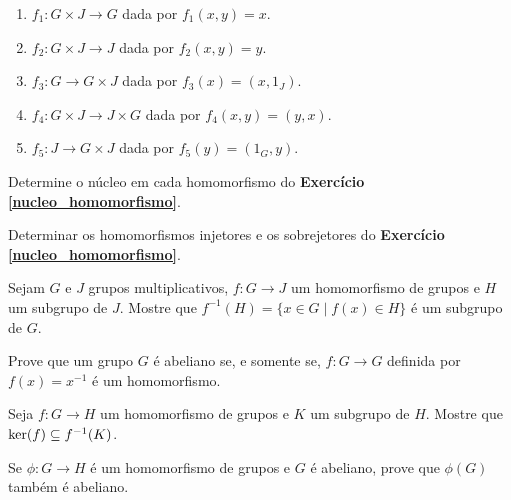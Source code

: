 \documentclass[12pt]{exam}
\begin{document}
    \begin{enumerate}[label=({\alph*})]
      \item $f_1 : G \times J \to G$ dada por $f_1(x,y) = x$.

      \item $f_2 : G \times J \to J$ dada por $f_2(x,y) = y$.

      \item $f_3 : G  \to G \times J$ dada por $f_3(x) = (x, 1_J)$.

      \item $f_4 : G \times J \to J \times G$ dada por $f_4(x,y) = (y, x)$.

      \item $f_5 : J \to G \times J$ dada por $f_5(y) = (1_G, y)$.
    \end{enumerate}

    \vspace{.3cm}

    \questao{} Determine o núcleo em cada homomorfismo do \textbf{Exercício \ref{nucleo_homomorfismo}}.

    \vspace{.3cm}

    \questao{} Determinar os homomorfismos injetores e os sobrejetores do \textbf{Exercício \ref{nucleo_homomorfismo}}.

    \vspace{.3cm}

    \questao{} Sejam $G$ e $J$ grupos multiplicativos, $f : G \to J$ um homomorfismo de grupos e $H$ um subgrupo de $J$. Mostre que $f^{-1}(H) = \{ x \in G \mid f(x) \in H\}$ é um subgrupo de $G$.

    \vspace{.3cm}

    \questao{} Prove que um grupo $G$ é abeliano se, e somente se, $f : G \to G$ definida por $f(x) = x^{-1}$ é um homomorfismo.

    \vspace{.3cm}

    \questao{} Seja $f: G\to H$ um homomorfismo de grupos e $K$ um subgrupo de $H$. Mostre que $\ker(f)\subseteq f^{-1}(K)$.

    \vspace{.3cm}

    \questao{} Se $\phi : G \to H$ é um homomorfismo de grupos e $G$ é abeliano, prove que $\phi(G)$ também é abeliano.

    \vspace{.3cm}
\end{document}

